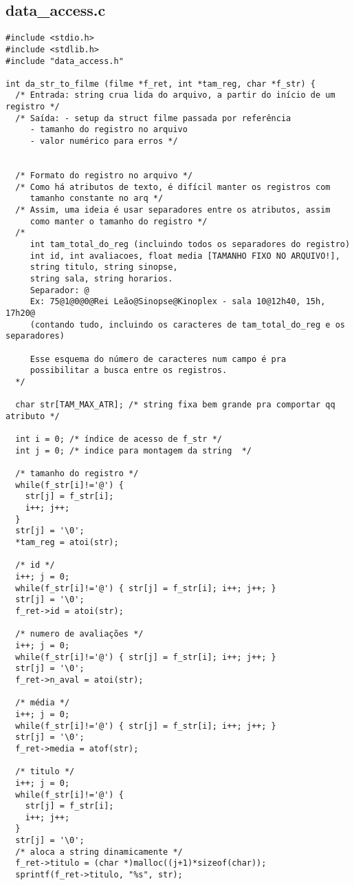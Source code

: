 \documentclass[11pt,twoside]{article}
\begin{document}
\subsection{data\_access.c} %
\begin{verbatim}
#include <stdio.h>
#include <stdlib.h>
#include "data_access.h"

int da_str_to_filme (filme *f_ret, int *tam_reg, char *f_str) {
  /* Entrada: string crua lida do arquivo, a partir do início de um registro */
  /* Saída: - setup da struct filme passada por referência 
     - tamanho do registro no arquivo
     - valor numérico para erros */
	

  /* Formato do registro no arquivo */
  /* Como há atributos de texto, é difícil manter os registros com 
     tamanho constante no arq */
  /* Assim, uma ideia é usar separadores entre os atributos, assim
     como manter o tamanho do registro */
  /* 
     int tam_total_do_reg (incluindo todos os separadores do registro)
     int id, int avaliacoes, float media [TAMANHO FIXO NO ARQUIVO!], 
     string titulo, string sinopse, 
     string sala, string horarios.
     Separador: @
     Ex: 75@1@0@0@Rei Leão@Sinopse@Kinoplex - sala 10@12h40, 15h, 17h20@
     (contando tudo, incluindo os caracteres de tam_total_do_reg e os separadores)

     Esse esquema do número de caracteres num campo é pra 
     possibilitar a busca entre os registros.
  */

  char str[TAM_MAX_ATR]; /* string fixa bem grande pra comportar qq atributo */

  int i = 0; /* índice de acesso de f_str */
  int j = 0; /* indice para montagem da string  */

  /* tamanho do registro */
  while(f_str[i]!='@') {
    str[j] = f_str[i];
    i++; j++;
  }
  str[j] = '\0';
  *tam_reg = atoi(str);

  /* id */
  i++; j = 0;
  while(f_str[i]!='@') { str[j] = f_str[i]; i++; j++; }
  str[j] = '\0'; 
  f_ret->id = atoi(str);

  /* numero de avaliações */
  i++; j = 0;
  while(f_str[i]!='@') { str[j] = f_str[i]; i++; j++; }
  str[j] = '\0';
  f_ret->n_aval = atoi(str);
	
  /* média */
  i++; j = 0;
  while(f_str[i]!='@') { str[j] = f_str[i]; i++; j++; }
  str[j] = '\0';
  f_ret->media = atof(str);
	
  /* titulo */
  i++; j = 0;
  while(f_str[i]!='@') {
    str[j] = f_str[i];
    i++; j++;
  }
  str[j] = '\0';
  /* aloca a string dinamicamente */
  f_ret->titulo = (char *)malloc((j+1)*sizeof(char));
  sprintf(f_ret->titulo, "%s", str);


\end{verbatim}
\end{document}
